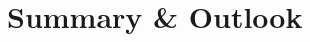 \documentclass[sigplan,11pt,nonacm]{acmart}
\begin{document}




\section{Summary \& Outlook}
\label{sec:summary}




\end{document}
